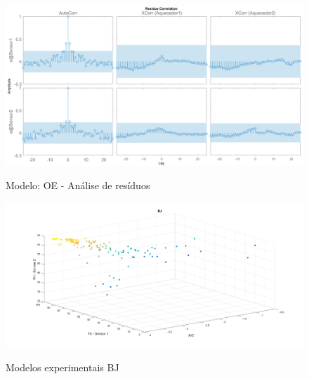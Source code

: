 \begin{apendicesenv}
\begin{figure}
	\caption{Modelo: OE - Análise de resíduos}
	\begin{center}
		\includegraphics[width=1.00\textwidth]{./5_images/tclabsp-models-OE-resid.png} 
		\label{fig:tclabsp-models-oe-resid}
	\end{center}
	\centering
\end{figure}

\begin{figure}[h]
	\caption{Modelos experimentais BJ}
	\begin{center}
		\includegraphics[width=1.00\textwidth]{./5_images/tclabsp-models-BJ.png} 
		\label{fig:tclabsp-models-bj}
	\end{center}
	\centering
\end{figure}


\end{apendicesenv}
